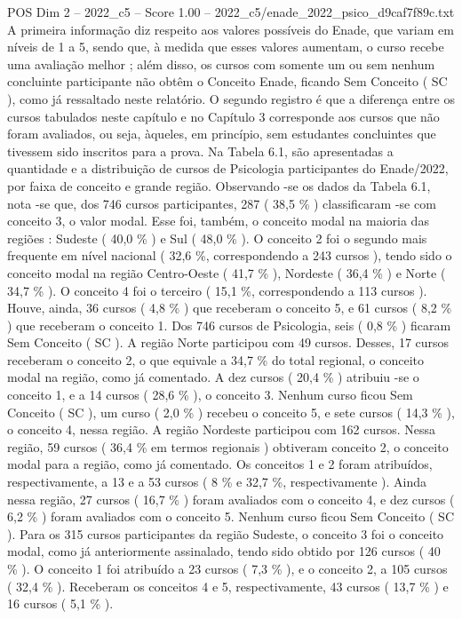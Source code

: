 \begin{textsample}{POS Dim 2 – 2022\_c5 – Score 1.00 – 2022\_c5/enade\_2022\_psico\_d9caf7f89c.txt}
A primeira informação diz respeito aos valores possíveis do Enade, que variam em níveis de 1 a 5, sendo que, à medida que esses valores aumentam, o curso recebe uma avaliação melhor ; além disso, os cursos com somente um ou sem nenhum concluinte participante não obtêm o Conceito Enade, ficando Sem Conceito ( SC ), como já ressaltado neste relatório.
O segundo registro é que a diferença entre os cursos tabulados neste capítulo e no Capítulo 3 corresponde aos cursos que não foram avaliados, ou seja, àqueles, em princípio, sem estudantes concluintes que tivessem sido inscritos para a prova.
Na Tabela 6.1, são apresentadas a quantidade e a distribuição de cursos de Psicologia participantes do Enade/2022, por faixa de conceito e grande região.
Observando -se os dados da Tabela 6.1, nota -se que, dos 746 cursos participantes, 287 ( 38,5 \% ) classificaram -se com conceito 3, o valor modal.
Esse foi, também, o conceito modal na maioria das regiões : Sudeste ( 40,0 \% ) e Sul ( 48,0 \% ).
O conceito 2 foi o segundo mais frequente em nível nacional ( 32,6 \%, correspondendo a 243 cursos ), tendo sido o conceito modal na região Centro-Oeste ( 41,7 \% ), Nordeste ( 36,4 \% ) e Norte ( 34,7 \% ).
O conceito 4 foi o terceiro ( 15,1 \%, correspondendo a 113 cursos ).
Houve, ainda, 36 cursos ( 4,8 \% ) que receberam o conceito 5, e 61 cursos ( 8,2 \% ) que receberam o conceito 1.
Dos 746 cursos de Psicologia, seis ( 0,8 \% ) ficaram Sem Conceito ( SC ).
A região Norte participou com 49 cursos.
Desses, 17 cursos receberam o conceito 2, o que equivale a 34,7 \% do total regional, o conceito modal na região, como já comentado.
A dez cursos ( 20,4 \% ) atribuiu -se o conceito 1, e a 14 cursos ( 28,6 \% ), o conceito 3.
Nenhum curso ficou Sem Conceito ( SC ), um curso ( 2,0 \% ) recebeu o conceito 5, e sete cursos ( 14,3 \% ), o conceito 4, nessa região.
A região Nordeste participou com 162 cursos.
Nessa região, 59 cursos ( 36,4 \% em termos regionais ) obtiveram conceito 2, o conceito modal para a região, como já comentado.
Os conceitos 1 e 2 foram atribuídos, respectivamente, a 13 e a 53 cursos ( 8 \% e 32,7 \%, respectivamente ).
Ainda nessa região, 27 cursos ( 16,7 \% ) foram avaliados com o conceito 4, e dez cursos ( 6,2 \% ) foram avaliados com o conceito 5.
Nenhum curso ficou Sem Conceito ( SC ).
Para os 315 cursos participantes da região Sudeste, o conceito 3 foi o conceito modal, como já anteriormente assinalado, tendo sido obtido por 126 cursos ( 40 \% ).
O conceito 1 foi atribuído a 23 cursos ( 7,3 \% ), e o conceito 2, a 105 cursos ( 32,4 \% ).
Receberam os conceitos 4 e 5, respectivamente, 43 cursos ( 13,7 \% ) e 16 cursos ( 5,1 \% ).

\end{textsample}
